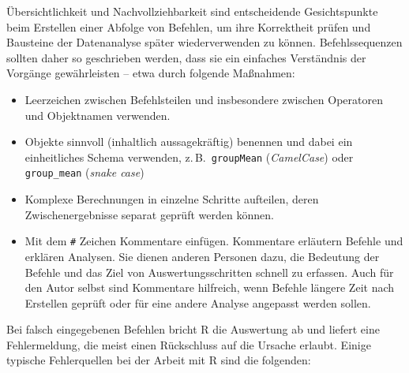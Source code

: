 Übersichtlichkeit und Nachvollziehbarkeit sind entscheidende Gesichtspunkte beim Erstellen einer Abfolge von Befehlen, um ihre Korrektheit prüfen und Bausteine der Datenanalyse später wiederverwenden zu können. Befehlssequenzen sollten daher so geschrieben werden, dass sie ein einfaches Verständnis der Vorgänge gewährleisten -- etwa durch folgende Maßnahmen:

\begin{itemize}
\item Leerzeichen zwischen Befehlsteilen und insbesondere zwischen Operatoren und Objektnamen verwenden.
\item Objekte sinnvoll (inhaltlich aussagekräftig) benennen und dabei ein einheitliches Schema verwenden, z.\,B.\ \lstinline!groupMean! (\emph{CamelCase}) oder \lstinline!group_mean! (\emph{snake case})
\item Komplexe Berechnungen in einzelne Schritte aufteilen, deren Zwischenergebnisse separat geprüft werden können.
\item Mit dem \lstinline!#! Zeichen Kommentare einfügen. Kommentare erläutern Befehle und erklären Analysen. Sie dienen anderen Personen dazu, die Bedeutung der Befehle und das Ziel von Auswertungsschritten schnell zu erfassen. Auch für den Autor selbst sind Kommentare hilfreich, wenn Befehle längere Zeit nach Erstellen geprüft oder für eine andere Analyse angepasst werden sollen.
\end{itemize}

Bei falsch eingegebenen Befehlen bricht R die Auswertung ab und liefert eine Fehlermeldung, die meist einen Rückschluss auf die Ursache erlaubt. Einige typische Fehlerquellen bei der Arbeit mit R sind die folgenden:

